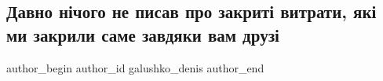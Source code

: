  
 
 
 
 

\subsection{Давно нічого не писав про закриті витрати, які ми закрили саме завдяки вам друзі}
\label{sec:09_12_2022.fb.galushko_denis.1.davno_n_chogo_ne_pis}

\ifcmt
 author_begin
   author_id galushko_denis
 author_end
\fi
